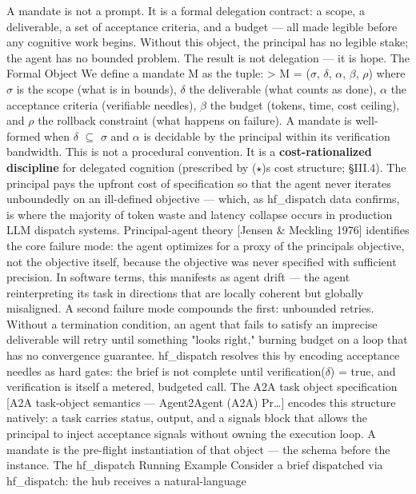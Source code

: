 \documentclass[
]{article}
\begin{document}
A mandate is not a prompt. It is a formal delegation contract: a scope,
a deliverable, a set of acceptance criteria, and a budget --- all made
legible before any cognitive work begins. Without this object, the
principal has no legible stake; the agent has no bounded problem. The
result is not delegation --- it is hope. The Formal Object We define a
mandate M as the tuple: \textgreater{} M = ($\sigma$, $\delta$, $\alpha$, $\beta$, $\rho$) where $\sigma$ is
the scope (what is in bounds), $\delta$ the deliverable (what counts as done),
$\alpha$ the acceptance criteria (verifiable needles), $\beta$ the budget (tokens,
time, cost ceiling), and $\rho$ the rollback constraint (what happens on
failure). A mandate is well-formed when $\delta$ $\subseteq$ $\sigma$ and $\alpha$ is decidable by the
principal within its verification bandwidth. This is not a procedural
convention. It is a \textbf{cost-rationalized discipline} for delegated
cognition (prescribed by ($\star$)\textquotesingle s cost structure; \S{}III.4).
The principal pays the upfront cost of specification so that the agent
never iterates unboundedly on an ill-defined objective --- which, as
hf\_dispatch data confirms, is where the majority of token waste and
latency collapse occurs in production LLM dispatch systems.
Principal-agent theory {[}Jensen \& Meckling 1976{]} identifies the core
failure mode: the agent optimizes for a proxy of the
principal\textquotesingle s objective, not the objective itself, because
the objective was never specified with sufficient precision. In software
terms, this manifests as agent drift --- the agent reinterpreting its
task in directions that are locally coherent but globally misaligned. A
second failure mode compounds the first: unbounded retries. Without a
termination condition, an agent that fails to satisfy an imprecise
deliverable will retry until something "looks right," burning budget on
a loop that has no convergence guarantee. hf\_dispatch resolves this by
encoding acceptance needles as hard gates: the brief is not complete
until verification($\delta$) = true, and verification is itself a metered,
budgeted call. The A2A task object specification {[}A2A task-object
semantics --- Agent2Agent (A2A) Pr\ldots{]} encodes this structure
natively: a task carries status, output, and a signals block that allows
the principal to inject acceptance signals without owning the execution
loop. A mandate is the pre-flight instantiation of that object --- the
schema before the instance. The hf\_dispatch Running Example Consider a
brief dispatched via hf\_dispatch: the hub receives a natural-language
\end{document}
